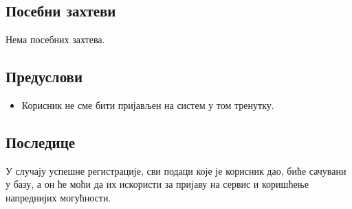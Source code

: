 \documentclass[12pt,a4paper]{article}
\begin{document}
\subsection{Посебни захтеви}
Нема посебних захтева.
\subsection{Предуслови}
 \begin{itemize}
     \item Корисник не сме бити пријављен на систем у том тренутку.
 \end{itemize}
 
 
\subsection{Последице}
У случају успешне регистрације, сви подаци које је корисник дао, биће сачувани у базу, а он ће моћи да их искористи за пријаву на сервис и коришћење напреднијих могућности.
\end{document}
